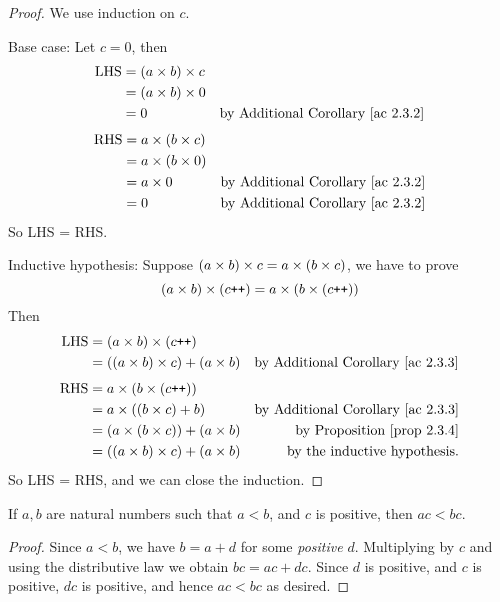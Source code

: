 \begin{proof}
We use induction on \(c\).

Base case: Let \(c = 0\), then
\begin{align*}
    \text{LHS} & = (a \times b) \times c \\
               & = (a \times b) \times 0 \\
               & = 0 & \text{by Additional Corollary \ref{ac 2.3.2}}
\end{align*}
\begin{align*}
    \text{RHS} & = a \times (b \times c) \\
               & = a \times (b \times 0) \\
               & = a \times 0 & \text{by Additional Corollary \ref{ac 2.3.2}} \\
               & = 0 & \text{by Additional Corollary \ref{ac 2.3.2}}
\end{align*}
So LHS = RHS.

Inductive hypothesis: Suppose \((a \times b) \times c = a \times (b \times c)\), we have to prove
\[(a \times b) \times (c\texttt{++}) = a \times (b \times (c\texttt{++}))\]
Then
\begin{align*}
    \text{LHS} & = (a \times b) \times (c\texttt{++}) \\
               & = ((a \times b) \times c) + (a \times b) & \text{by Additional Corollary \ref{ac 2.3.3}} \\
\end{align*}
\begin{align*}
    \text{RHS} & = a \times (b \times (c\texttt{++})) \\
               & = a \times ((b \times c) + b) & \text{by Additional Corollary \ref{ac 2.3.3}} \\
               & = (a \times (b \times c)) + (a \times b) & \text{by Proposition \ref{prop 2.3.4}} \\
               & = ((a \times b) \times c) + (a \times b) & \text{by the inductive hypothesis}.
\end{align*}
So LHS = RHS, and we can close the induction.
\end{proof}

\begin{proposition}\label{prop 2.3.6}
If \(a, b\) are natural numbers such that \(a < b\), and \(c\) is positive, then \(ac < bc\).
\end{proposition}
\begin{proof}
Since \(a < b\), we have \(b = a + d\) for some \emph{positive} \(d\). Multiplying by \(c\) and using the distributive law we obtain \(bc = ac + dc\). Since \(d\) is positive, and \(c\) is positive, \(dc\) is positive, and hence \(ac < bc\) as desired.
\end{proof}

